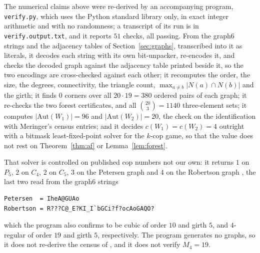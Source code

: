 \documentclass[11pt]{amsart}
\theoremstyle{remark}
\newcommand{\cn}{c}
\begin{document}
The numerical claims above were re-derived by an accompanying program, \texttt{verify.py},
which uses the Python standard library only, in exact integer arithmetic and with no
randomness; a transcript of its run is in \texttt{verify.output.txt}, and it reports $51$
checks, all passing. From the graph6 strings and the adjacency tables of
Section~\ref{sec:graphs}, transcribed into it as literals, it decodes each string with its own
bit-unpacker, re-encodes it, and checks the decoded graph against the adjacency table printed
beside it, so the two encodings are cross-checked against each other; it recomputes the order,
the size, the degrees, connectivity, the triangle count, $\max_{a\ne b}|N(a)\cap N(b)|$ and the
girth; it finds $0$ corners over all $20\cdot19=380$ ordered pairs of each graph; it re-checks
the two forest certificates, and all $\binom{20}{3}=1140$ three-element sets; it computes
$|\mathrm{Aut}(W_1)|=96$ and $|\mathrm{Aut}(W_2)|=20$, the check on the identification with
Meringer's census entries; and it decides $\cn(W_1)=\cn(W_2)=4$ outright with a bitmask
least-fixed-point solver for the $k$-cop game, so that the value does not rest on
Theorem~\ref{thm:af} or Lemma~\ref{lem:forest}.

That solver is controlled on published cop numbers not our own: it returns $1$ on $P_5$, $2$ on
$C_4$, $2$ on $C_5$, $3$ on the Petersen graph and $4$ on the Robertson graph \cite{Robertson},
the last two read from the graph6 strings

\begin{verbatim}
Petersen  = IheA@GUAo
Robertson = R???C@_E?KI_I`bGCi?f?ocAoGAQO?
\end{verbatim}

\noindent
which the program also confirms to be cubic of order $10$ and girth $5$, and $4$-regular of
order $19$ and girth $5$, respectively. The program generates no graphs, so it does not
re-derive the census of \cite{Meringer}, and it does not verify $M_4=19$.
\end{document}
